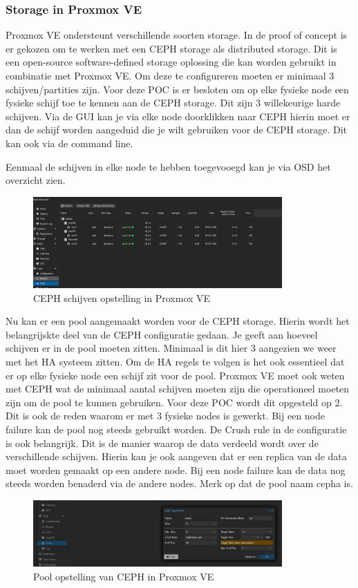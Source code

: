 \subsubsection{Storage in Proxmox VE}
Proxmox VE ondersteunt verschillende soorten storage. In de proof of concept is er gekozen om te werken met een CEPH storage als distributed storage. Dit is een open-source software-defined storage oplossing die kan worden gebruikt in combinatie met Proxmox VE.
Om deze te configureren moeten er minimaal 3 schijven/partities zijn. Voor deze POC is er besloten om op elke fysieke node een fysieke schijf toe te kennen aan de CEPH storage. Dit zijn 3 willekeurige harde schijven.
Via de GUI kan je via elke node doorklikken naar CEPH hierin moet er dan de schijf worden aangeduid die je wilt gebruiken voor de CEPH storage. Dit kan ook via de command line.

Eenmaal de schijven in elke node te hebben toegevooegd kan je via OSD het overzicht zien.
\begin{figure}[H]
  \centering
  \includegraphics[width=0.85\textwidth]{../poc/ceph-osd-prox.png}
  \caption{CEPH schijven opstelling in Proxmox VE}
  \label{fig:osd-ceph-proxmox}
\end{figure}

Nu kan er een pool aangemaakt worden voor de CEPH storage. Hierin wordt het belangrijskte deel van de CEPH configuratie gedaan.
Je geeft aan hoeveel schijven er in de pool moeten zitten. Minimaal is dit hier 3 aangezien we weer met het HA systeem zitten. Om de HA regels te volgen is het ook essentieel dat er op elke fysieke node een schijf zit voor de pool.
Proxmox VE moet ook weten met CEPH wat de minimaal aantal schijven moeten zijn die operationeel moeten zijn om de pool te kunnen gebruiken. Voor deze POC wordt dit opgesteld op 2. Dit is ook de reden waarom er met 3 fysieke nodes is gewerkt. Bij een node failure kan de pool nog steeds gebruikt worden.
De Crush rule in de configuratie is ook belangrijk. Dit is de manier waarop de data verdeeld wordt over de verschillende schijven. Hierin kan je ook aangeven dat er een replica van de data moet worden gemaakt op een andere node. Bij een node failure kan de data nog steeds worden benaderd via de andere nodes.
Merk op dat de pool naam cepha is.
\begin{figure}[H]
  \centering
  \includegraphics[width=0.85\textwidth]{../poc/ceph-pool-prox.png}
  \caption{Pool opstelling van CEPH in Proxmox VE}
  \label{fig:ceph-pool-prox}
\end{figure}

